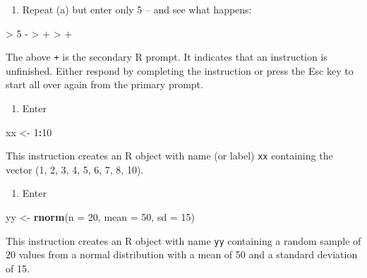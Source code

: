 \documentclass[
]{book}
\newenvironment{Shaded}{\begin{snugshade}}{\end{snugshade}}
\newcommand{\AttributeTok}[1]{\textcolor[rgb]{0.13,0.29,0.53}{#1}}
\newcommand{\DecValTok}[1]{\textcolor[rgb]{0.00,0.00,0.81}{#1}}
\newcommand{\FunctionTok}[1]{\textcolor[rgb]{0.13,0.29,0.53}{\textbf{#1}}}
\newcommand{\NormalTok}[1]{#1}
\newcommand{\OtherTok}[1]{\textcolor[rgb]{0.56,0.35,0.01}{#1}}
\newcommand{\SpecialCharTok}[1]{\textcolor[rgb]{0.81,0.36,0.00}{\textbf{#1}}}
\providecommand{\tightlist}{%
  \setlength{\itemsep}{0pt}\setlength{\parskip}{0pt}}
\begin{document}
\begin{enumerate}
\def\labelenumi{(\alph{enumi})}
\setcounter{enumi}{1}
\tightlist
\item
  Repeat (a) but enter only 5 -- and see what happens:
\end{enumerate}

\begin{Shaded}
\begin{Highlighting}[]
\NormalTok{\textgreater{} 5 {-}}
\NormalTok{\textgreater{} +}
\NormalTok{\textgreater{} +}
\end{Highlighting}
\end{Shaded}

The above \texttt{+} is the secondary R prompt. It indicates that an instruction is unfinished. Either respond by completing the instruction or press the {Esc} key to start all over again from the primary prompt.

\begin{enumerate}
\def\labelenumi{(\alph{enumi})}
\setcounter{enumi}{2}
\tightlist
\item
  Enter
\end{enumerate}

\begin{Shaded}
\begin{Highlighting}[]
\NormalTok{xx }\OtherTok{\textless{}{-}} \DecValTok{1}\SpecialCharTok{:}\DecValTok{10}
\end{Highlighting}
\end{Shaded}

This instruction creates an R object with name (or label) \texttt{xx} containing the vector
(1, 2, 3, 4, 5, 6, 7, 8, 10).

\begin{enumerate}
\def\labelenumi{(\alph{enumi})}
\setcounter{enumi}{3}
\tightlist
\item
  Enter
\end{enumerate}

\begin{Shaded}
\begin{Highlighting}[]
\NormalTok{yy }\OtherTok{\textless{}{-}} \FunctionTok{rnorm}\NormalTok{(}\AttributeTok{n =} \DecValTok{20}\NormalTok{, }\AttributeTok{mean =} \DecValTok{50}\NormalTok{, }\AttributeTok{sd =} \DecValTok{15}\NormalTok{) }
\end{Highlighting}
\end{Shaded}

This instruction creates an R object with name \texttt{yy} containing a random sample of 20 values from a normal distribution with a mean of 50 and a standard deviation of 15.
\end{document}
